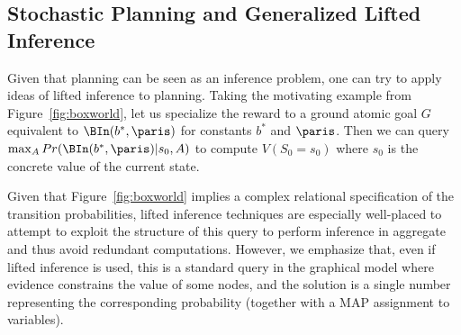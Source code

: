 \subsection{Stochastic Planning and Generalized Lifted Inference}

Given that planning can be seen as an inference problem, one can try
to apply ideas of lifted inference to planning.  Taking the motivating
example from Figure~\ref{fig:boxworld}, let us specialize the reward
to a ground atomic goal $G$ equivalent to $\BIn(b^*,\paris)$ for
constants $b^*$ and $\paris$.  Then we can query
$\max_A Pr(\BIn(b^*,\paris)|s_0,A)$ to compute $V(S_0=s_0)$ where $s_0$ is
the concrete value of the current state.  

Given that
Figure~\ref{fig:boxworld} implies a complex relational specification
of the transition probabilities, lifted inference techniques are
especially well-placed to attempt to exploit the structure of this
query to perform inference in aggregate and thus avoid redundant
computations.
%
However, we emphasize that, even if lifted inference is used, this is a standard query in the graphical model where evidence constrains the value of some nodes, and the solution is a single number representing the corresponding probability (together with a MAP assignment to variables). 


%
%
%
%
%
%
%

